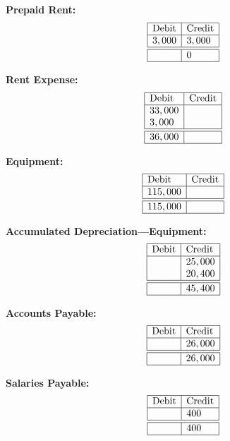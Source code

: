 \documentclass[12pt,a4paper]{book}
\begin{document}
\begin{multicols}{3}
\textbf{Prepaid Rent:}
\[
\begin{array}{|l|l|}
\hline
\text{Debit} & \text{Credit} \\
\hline
3,000 & 3,000 \\
\hline \hline 
 & 0 \\
\hline
\end{array}
\]

\vspace{0.5cm}

\textbf{Rent Expense:}
\[
\begin{array}{|l|l|}
\hline
\text{Debit} & \text{Credit} \\
\hline
33,000 & \\
3,000 & \\
\hline \hline 
36,000 & \\
\hline
\end{array}
\]

\vspace{0.5cm}

\textbf{Equipment:}
\[
\begin{array}{|l|l|}
\hline
\text{Debit} & \text{Credit} \\
\hline
115,000 & \\
\hline \hline 
115,000 & \\
\hline
\end{array}
\]

\vspace{0.5cm}

\textbf{Accumulated Depreciation—Equipment:}
\[
\begin{array}{|l|l|}
\hline
\text{Debit} & \text{Credit} \\
\hline
 & 25,000 \\
 & 20,400 \\
\hline \hline 
 & 45,400 \\
\hline
\end{array}
\]

\vspace{0.5cm}

\textbf{Accounts Payable:}
\[
\begin{array}{|l|l|}
\hline
\text{Debit} & \text{Credit} \\
\hline
 & 26,000 \\
\hline \hline
 & 26,000 \\
\hline
\end{array}
\]

\vspace{0.5cm}

\textbf{Salaries Payable:}
\[
\begin{array}{|l|l|}
\hline
\text{Debit} & \text{Credit} \\
\hline
 & 400 \\
\hline \hline 
 & 400 \\
\hline
\end{array}
\]


\end{multicols}
\end{document}
